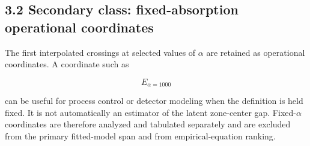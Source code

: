 \subsection{3.2 Secondary class: fixed-absorption operational
coordinates}\label{secondary-class-fixed-absorption-operational-coordinates}

The first interpolated crossings at selected values of \(\alpha\) are
retained as operational coordinates. A coordinate such as

\[
E_{\alpha=1000}
\]

can be useful for process control or detector modeling when the
definition is held fixed. It is not automatically an estimator of the
latent zone-center gap. Fixed-\(\alpha\) coordinates are therefore
analyzed and tabulated separately and are excluded from the primary
fitted-model span and from empirical-equation ranking.
